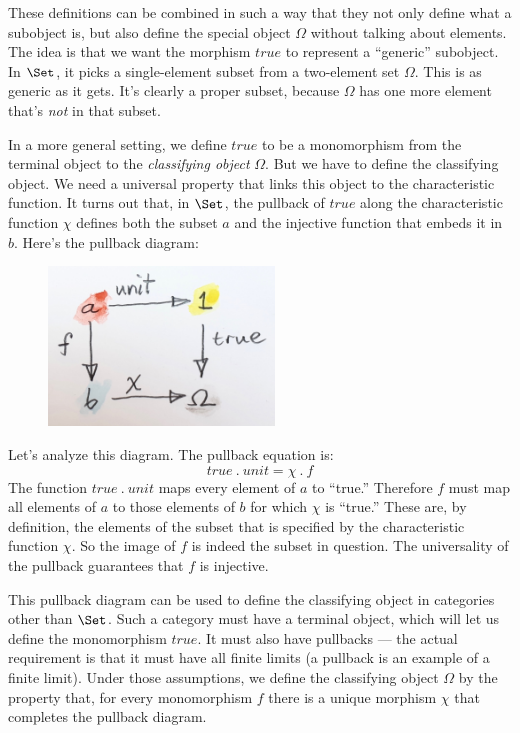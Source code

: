 \noindent
These definitions can be combined in such a way that they not only
define what a subobject is, but also define the special object
$\Omega$ without talking about elements. The idea is that we want the
morphism $true$ to represent a ``generic'' subobject. In
$\Set$, it picks a single-element subset from a two-element set
$\Omega$. This is as generic as it gets. It's clearly a proper subset,
because $\Omega$ has one more element that's \emph{not} in that
subset.

In a more general setting, we define $true$ to be a monomorphism
from the terminal object to the \emph{classifying object} $\Omega$.
But we have to define the classifying object. We need a universal
property that links this object to the characteristic function. It turns
out that, in $\Set$, the pullback of $true$ along the
characteristic function $\chi$ defines both the subset $a$
and the injective function that embeds it in $b$. Here's the
pullback diagram:

\begin{figure}[H]
\centering
\includegraphics[width=60mm]{images/pullback.jpg}
\end{figure}

\noindent
Let's analyze this diagram. The pullback equation is:
\[true\ .\ unit = \chi\ .\ f\]
The function $true\ .\ unit$ maps every element of $a$ to
``true.'' Therefore $f$ must map all elements of $a$ to
those elements of $b$ for which $\chi$ is ``true.'' These
are, by definition, the elements of the subset that is specified by the
characteristic function $\chi$. So the image of $f$ is indeed
the subset in question. The universality of the pullback guarantees that
$f$ is injective.

This pullback diagram can be used to define the classifying object in
categories other than $\Set$. Such a category must have a terminal
object, which will let us define the monomorphism $true$. It must
also have pullbacks --- the actual requirement is that it must have all
finite limits (a pullback is an example of a finite limit). Under those
assumptions, we define the classifying object $\Omega$ by the property
that, for every monomorphism $f$ there is a unique morphism
$\chi$ that completes the pullback diagram.

